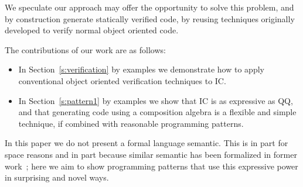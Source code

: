 We speculate our approach may offer the opportunity to solve this problem,
and by construction generate statically verified code,
by reusing techniques originally developed to verify normal object oriented code.


The contributions of our work are as follows:
\begin{itemize}
\item
In Section~\ref{s:verification}
by examples we demonstrate how to apply conventional object oriented verification techniques to IC.

\item
In Section~\ref{s:pattern1}
by examples we show that IC is as expressive as QQ, and that
generating code using a composition algebra
is a flexible and simple technique, if combined with
reasonable programming patterns.
\end{itemize}

In this paper we do not present a formal language semantic. This is in part for space reasons
and in part because similar semantic has been formalized in former work~\cite{servetto2014meta};
here we aim to show programming patterns that use this expressive power in surprising and novel ways.



